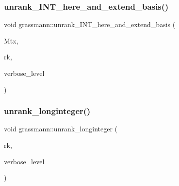 \mbox{\label{classgrassmann_a1de95ba53cf25cda531e8de9bcf813d0}} 
\subsubsection{\texorpdfstring{unrank\+\_\+\+I\+N\+T\+\_\+here\+\_\+and\+\_\+extend\+\_\+basis()}{unrank\_INT\_here\_and\_extend\_basis()}}
{\footnotesize\ttfamily void grassmann\+::unrank\+\_\+\+I\+N\+T\+\_\+here\+\_\+and\+\_\+extend\+\_\+basis (\begin{DoxyParamCaption}\item[{\mbox{\hyperlink{galois_8h_a09fddde158a3a20bd2dcadb609de11dc}{I\+NT}} $\ast$}]{Mtx,  }\item[{\mbox{\hyperlink{galois_8h_a09fddde158a3a20bd2dcadb609de11dc}{I\+NT}}}]{rk,  }\item[{\mbox{\hyperlink{galois_8h_a09fddde158a3a20bd2dcadb609de11dc}{I\+NT}}}]{verbose\+\_\+level }\end{DoxyParamCaption})}

\mbox{\label{classgrassmann_aede73ec7ffd4596b9b9953f5583bdc76}} 
\subsubsection{\texorpdfstring{unrank\+\_\+longinteger()}{unrank\_longinteger()}}
{\footnotesize\ttfamily void grassmann\+::unrank\+\_\+longinteger (\begin{DoxyParamCaption}\item[{\mbox{\hyperlink{classlonginteger__object}{longinteger\+\_\+object}} \&}]{rk,  }\item[{\mbox{\hyperlink{galois_8h_a09fddde158a3a20bd2dcadb609de11dc}{I\+NT}}}]{verbose\+\_\+level }\end{DoxyParamCaption})}

\mbox{\label{classgrassmann_a0e7283e3925e266cb18b6a3557822ab9}} 
